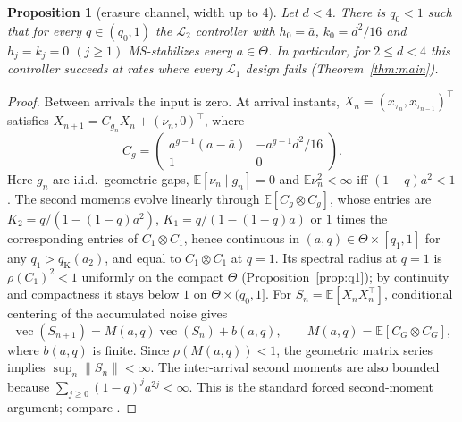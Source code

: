 \documentclass[preprint,12pt,numbers]{elsarticle}
\newtheorem{proposition}{Proposition}
\theoremstyle{definition}
\newcommand{\E}{\mathbb{E}}
\newcommand{\Lone}{\mathcal{L}_1}
\newcommand{\Ltwo}{\mathcal{L}_2}
\newcommand{\abar}{\bar a}
\newcommand{\qK}{q_{\mathrm K}}
\begin{document}
\begin{proposition}[erasure channel, width up to 4]\label{prop:near1}
Let $d<4$. There is $q_0<1$ such that for every $q\in(q_0,1)$ the $\Ltwo$ controller with $h_0=\abar$, $k_0=d^2/16$ and $h_j=k_j=0$ $(j\ge1)$ MS-stabilizes every $a\in\Theta$. In particular, for $2\le d<4$ this controller succeeds at rates where every $\Lone$ design fails (Theorem~\ref{thm:main}).
\end{proposition}
\begin{proof}
Between arrivals the input is zero. At arrival instants, $X_n=(x_{\tau_n},x_{\tau_{n-1}})^\top$ satisfies $X_{n+1}=C_{g_n}X_n+(\nu_n,0)^\top$, where
\[
C_g=\begin{pmatrix}
a^{g-1}(a-\abar)&-a^{g-1}d^2/16\\
1&0
\end{pmatrix}.
\]
Here $g_n$ are i.i.d.\ geometric gaps, $\E[\nu_n\mid g_n]=0$ and $\E\nu_n^2<\infty$ iff $(1-q)a^2<1$. The second moments evolve linearly through $\E[C_g\otimes C_g]$, whose entries are $K_2=q/(1-(1-q)a^2)$, $K_1=q/(1-(1-q)a)$ or $1$ times the corresponding entries of $C_1\otimes C_1$, hence continuous in $(a,q)\in\Theta\times[q_1,1]$ for any $q_1>\qK(a_2)$, and equal to $C_1\otimes C_1$ at $q=1$. Its spectral radius at $q=1$ is $\rho(C_1)^2<1$ uniformly on the compact $\Theta$ (Proposition~\ref{prop:q1}); by continuity and compactness it stays below $1$ on $\Theta\times(q_0,1]$. For $S_n=\E[X_nX_n^\top]$, conditional centering of the accumulated noise gives
\[
\operatorname{vec}(S_{n+1})=M(a,q)\operatorname{vec}(S_n)+b(a,q),
\qquad M(a,q)=\E[C_G\otimes C_G],
\]
where $b(a,q)$ is finite. Since $\rho(M(a,q))<1$, the geometric matrix series implies $\sup_n\|S_n\|<\infty$. The inter-arrival second moments are also bounded because $\sum_{j\ge0}(1-q)^ja^{2j}<\infty$. This is the standard forced second-moment argument; compare \citet[Ch.~3, Sections~3.3--3.4]{costa2005}.
\end{proof}
\end{document}
